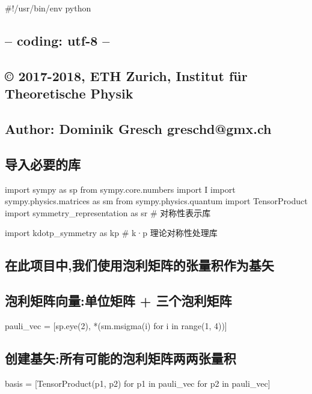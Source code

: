 \documentclass[lang=cn,scheme=chinese,color=blue,device=normal,toc=onecol,math=cm]{elegantbook}
\begin{document}
\#!/\allowbreak{}usr/\allowbreak{}bin/\allowbreak{}env python\par


\subsection{-- coding: utf-8 --}


\subsection{© 2017-2018, ETH Zurich, Institut für Theoretische Physik}


\subsection{Author: Dominik Gresch greschd@gmx.ch}


\subsection{导入必要的库}


import sympy as sp from sympy.core.numbers import I import sympy.physics.matrices as sm from sympy.physics.quantum import TensorProduct import symmetry\_\allowbreak{}representation as sr \# 对称性表示库\par


import kdotp\_\allowbreak{}symmetry as kp \# k·p 理论对称性处理库\par


\subsection{在此项目中,我们使用泡利矩阵的张量积作为基矢}


\subsection{泡利矩阵向量:单位矩阵 + 三个泡利矩阵}


pauli\_\allowbreak{}vec = [sp.eye(2), *(sm.msigma(i) for i in range(1, 4))]\par


\subsection{创建基矢:所有可能的泡利矩阵两两张量积}


basis = [TensorProduct(p1, p2) for p1 in pauli\_\allowbreak{}vec for p2 in pauli\_\allowbreak{}vec]\par
\end{document}
